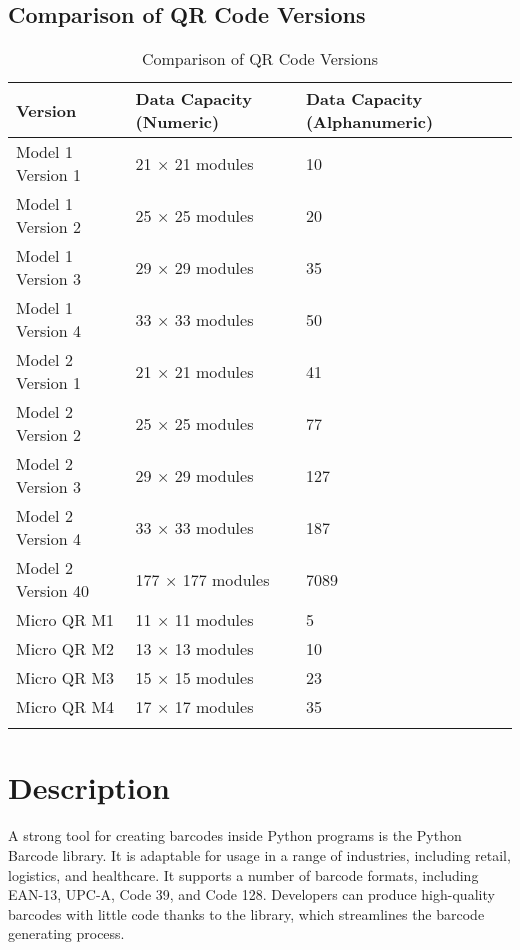 \subsection{Comparison of QR Code Versions}

\begin{longtable}{|m{3.5cm}|m{5cm}|m{6cm}|}
	\hline
	\textbf{Version} & \textbf{Data Capacity (Numeric)} & \textbf{Data Capacity (Alphanumeric)} \\
	\hline
	Model 1 Version 1 & 21 × 21 modules & 10 \\
	\hline
	Model 1 Version 2 & 25 × 25 modules & 20 \\
	\hline
	Model 1 Version 3 & 29 × 29 modules & 35 \\
	\hline
	Model 1 Version 4 & 33 × 33 modules & 50 \\
	\hline
	Model 2 Version 1 & 21 × 21 modules & 41 \\
	\hline
	Model 2 Version 2 & 25 × 25 modules & 77 \\
	\hline
	Model 2 Version 3 & 29 × 29 modules & 127 \\
	\hline
	Model 2 Version 4 & 33 × 33 modules & 187 \\
	\hline
	Model 2 Version 40 & 177 × 177 modules & 7089 \\
	\hline
	Micro QR M1 & 11 × 11 modules & 5 \\
	\hline
	Micro QR M2 & 13 × 13 modules & 10 \\
	\hline
	Micro QR M3 & 15 × 15 modules & 23 \\
	\hline
	Micro QR M4 & 17 × 17 modules & 35 \\
	\hline
	\caption{Comparison of QR Code Versions}
\end{longtable}







\section{Description}

A strong tool for creating barcodes inside Python programs is the Python Barcode library. It is adaptable for usage in a range of industries, including retail, logistics, and healthcare. It supports a number of barcode formats, including EAN-13, UPC-A, Code 39, and Code 128. Developers can produce high-quality barcodes with little code thanks to the library, which streamlines the barcode generating process.

